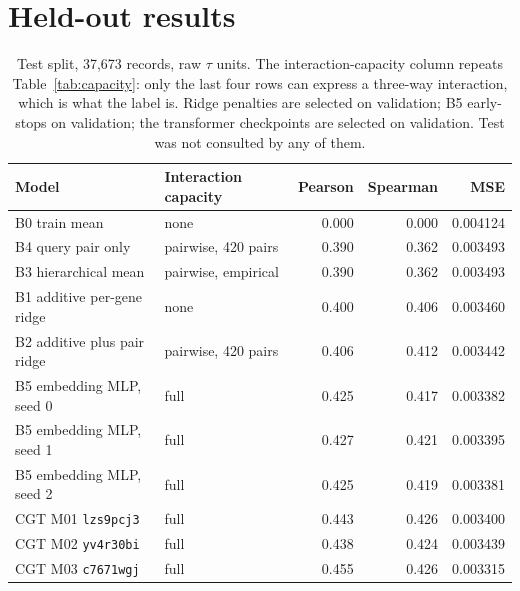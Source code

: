 
\section{Held-out results}
\label{sec:results}

\begin{table}[htbp]
\centering
\begin{tabular}{llrrr}
\hline
Model & Interaction capacity & Pearson & Spearman & MSE \\
\hline
B0 train mean & none & 0.000 & 0.000 & 0.004124 \\
B4 query pair only & pairwise, 420 pairs & 0.390 & 0.362 & 0.003493 \\
B3 hierarchical mean & pairwise, empirical & 0.390 & 0.362 & 0.003493 \\
B1 additive per-gene ridge & none & 0.400 & 0.406 & 0.003460 \\
B2 additive plus pair ridge & pairwise, 420 pairs & 0.406 & 0.412 & 0.003442 \\
B5 embedding MLP, seed 0 & full & 0.425 & 0.417 & 0.003382 \\
B5 embedding MLP, seed 1 & full & 0.427 & 0.421 & 0.003395 \\
B5 embedding MLP, seed 2 & full & 0.425 & 0.419 & 0.003381 \\
CGT M01 \texttt{lzs9pcj3} & full & 0.443 & 0.426 & 0.003400 \\
CGT M02 \texttt{yv4r30bi} & full & 0.438 & 0.424 & 0.003439 \\
CGT M03 \texttt{c7671wgj} & full & 0.455 & 0.426 & 0.003315 \\
\hline
\end{tabular}
\caption{Test split, 37{,}673 records, raw $\tau$ units. The interaction-capacity
column repeats Table~\ref{tab:capacity}: only the last four rows can express a
three-way interaction, which is what the label is. Ridge penalties are selected
on validation; B5 early-stops on validation; the transformer checkpoints are
selected on validation. Test was not consulted by any of them.}
\label{tab:heldout}
\end{table}

